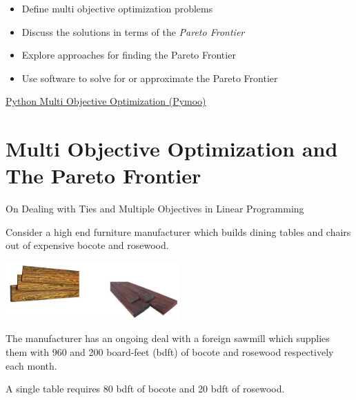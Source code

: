 %
%

\begin{outcome}
\begin{itemize}
\item Define multi objective optimization problems
\item Discuss the solutions in terms of the \emph{Pareto Frontier}
\item Explore approaches for finding the Pareto Frontier
\item Use software to solve for or approximate the Pareto Frontier
\end{itemize}
\end{outcome}

\begin{resource}
\href{https://pymoo.org/}{Python Multi Objective Optimization (Pymoo)}
\end{resource}

\section{Multi Objective Optimization and The Pareto Frontier}
On Dealing with Ties and Multiple Objectives in Linear Programming



Consider a high end furniture manufacturer which builds dining tables and chairs out of expensive bocote and rosewood.

\includegraphics[width=0.5\textwidth]{optimization/multi-objective/images/2022_02_28_634e8079070800ac7e3cg-02}

The manufacturer has an ongoing deal with a foreign sawmill which supplies them with 960 and 200 board-feet (bdft) of bocote and rosewood respectively each month.

A single table requires 80 bdft of bocote and 20 bdft of rosewood.

